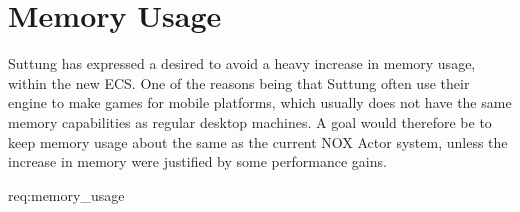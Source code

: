 \section{Memory Usage}
Suttung has expressed a desired to avoid a heavy increase in memory usage,
within the new ECS.
One of the reasons being that Suttung often use their engine to
make games for mobile platforms, which usually does not have the same memory
capabilities as regular desktop machines.
A goal would therefore be to keep memory usage about the same as the current
NOX Actor system, unless the increase in memory were justified by some performance
gains.

{req:memory_usage}
